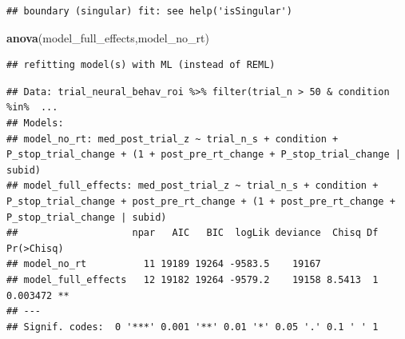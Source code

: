 \documentclass[
]{article}
\newenvironment{Shaded}{\begin{snugshade}}{\end{snugshade}}
\newcommand{\DecValTok}[1]{\textcolor[rgb]{0.00,0.00,0.81}{#1}}
\newcommand{\KeywordTok}[1]{\textcolor[rgb]{0.13,0.29,0.53}{\textbf{#1}}}
\newcommand{\NormalTok}[1]{#1}
\newcommand{\OperatorTok}[1]{\textcolor[rgb]{0.81,0.36,0.00}{\textbf{#1}}}
\newcommand{\StringTok}[1]{\textcolor[rgb]{0.31,0.60,0.02}{#1}}
\begin{document}
\begin{verbatim}
## boundary (singular) fit: see help('isSingular')
\end{verbatim}

\begin{Shaded}
\begin{Highlighting}[]
\KeywordTok{anova}\NormalTok{(model_full_effects,model_no_rt)}
\end{Highlighting}
\end{Shaded}

\begin{verbatim}
## refitting model(s) with ML (instead of REML)
\end{verbatim}

\begin{verbatim}
## Data: trial_neural_behav_roi %>% filter(trial_n > 50 & condition %in%  ...
## Models:
## model_no_rt: med_post_trial_z ~ trial_n_s + condition + P_stop_trial_change + (1 + post_pre_rt_change + P_stop_trial_change | subid)
## model_full_effects: med_post_trial_z ~ trial_n_s + condition + P_stop_trial_change + post_pre_rt_change + (1 + post_pre_rt_change + P_stop_trial_change | subid)
##                    npar   AIC   BIC  logLik deviance  Chisq Df Pr(>Chisq)   
## model_no_rt          11 19189 19264 -9583.5    19167                        
## model_full_effects   12 19182 19264 -9579.2    19158 8.5413  1   0.003472 **
## ---
## Signif. codes:  0 '***' 0.001 '**' 0.01 '*' 0.05 '.' 0.1 ' ' 1
\end{verbatim}

\begin{Shaded}
\end{Shaded}
\end{document}
